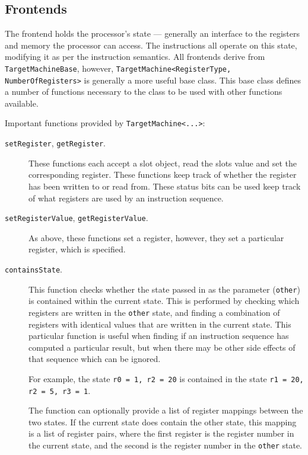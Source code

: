 \documentclass{article}
\begin{document}
\subsection{Frontends}


The frontend holds the processor's state --- generally an interface to the registers and memory the processor can access. The instructions all operate on this state, modifying it as per the instruction semantics. All frontends derive from \texttt{TargetMachineBase}, however, \texttt{TargetMachine<RegisterType, NumberOfRegisters>} is generally a more useful base class. This base class defines a number of functions necessary to the class to be used with other functions available.

Important functions provided by \texttt{TargetMachine<...>}:
\begin{description}
    \item[\texttt{setRegister}, \texttt{getRegister}.] These functions each accept a slot object, read the slots value and set the corresponding register. These functions keep track of whether the register has been written to or read from. These status bits can be used keep track of what registers are used by an instruction sequence.
    \item[\texttt{setRegisterValue}, \texttt{getRegisterValue}.] As above, these functions set a register, however, they set a particular register, which is specified.
    \item[\texttt{containsState}.] This function checks whether the state passed in as the parameter (\texttt{other}) is contained within the current state. This is performed by checking which registers are written in the \texttt{other} state, and finding a combination of registers with identical values that are written in the current state. This particular function is useful when finding if an instruction sequence has computed a particular result, but when there may be other side effects of that sequence which can be ignored.

    For example, the state \texttt{r0 = 1, r2 = 20} is contained in the state \texttt{r1 = 20, r2 = 5, r3 = 1}.

    The function can optionally provide a list of register mappings between the two states. If the current state does contain the other state, this mapping is a list of register pairs, where the first register is the register number in the current state, and the second is the register number in the \texttt{other} state.
\end{description}
\end{document}

